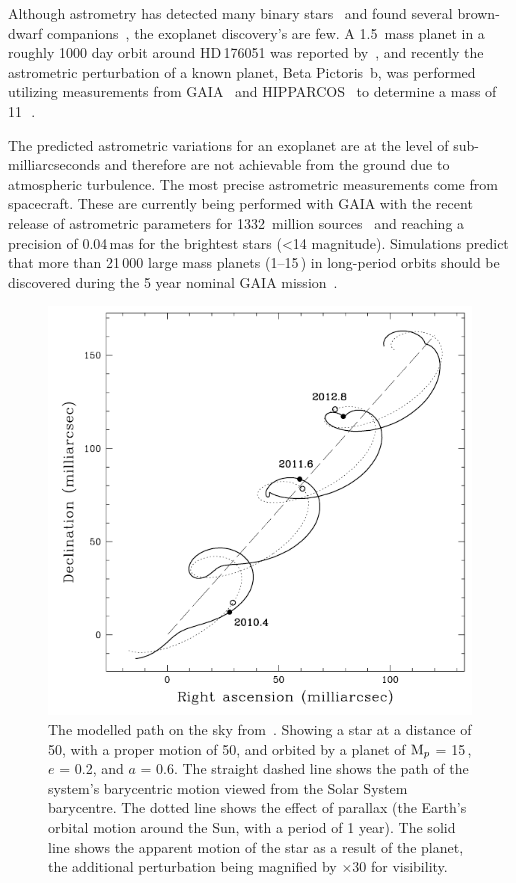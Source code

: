 Although astrometry has detected many binary stars~\citep[e.g.][]{gontcharov_new_2000} and found several brown-dwarf companions~\citep[e.g.][]{sahlmann_search_2011}, the exoplanet discovery's are few.
A 1.5\,\Mjup{} mass planet in a roughly 1000 day orbit around {HD\,176051} was reported by~\citet{muterspaugh_phases_2010}, and recently the astrometric perturbation of a known planet, {Beta Pictoris~b}, was performed utilizing measurements from {GAIA}~\citep{gaiacollaboration_gaia_2016} and {HIPPARCOS}~\citep{esa_hipparcos_1997} to determine a mass of 11\,\Mjup~\citep{snellen_mass_2018}.

The predicted astrometric variations for an exoplanet are at the level of sub-milliarcseconds and therefore are not achievable from the ground due to atmospheric turbulence.
The most precise astrometric measurements come from spacecraft.
These are currently being performed with GAIA with the recent release of astrometric parameters for 1332~million sources~\citep{collaboration_gaia_2018} and reaching a precision of 0.04\,mas for the brightest stars (<14 magnitude).
Simulations predict that more than 21\,000 large mass planets (1--15\,\Mjup) in long-period orbits should be discovered during the 5 year nominal GAIA mission~\citep{perryman_astrometric_2014}.

\begin{figure}
    \centering
    \includegraphics[width=0.5\linewidth]{./figures/introduction/Astrometry_Perryman2000.png}
    \caption{The modelled path on the sky from~\citet{perryman_extrasolar_2000}.
        Showing a star at a distance of 50\pc, with a proper motion of 50\masperyr{}, and orbited by a planet of $\textrm{M}_{p}$ = 15\,\Mjup{}, $e$ = 0.2, and $a$ = 0.6\AU{}.
        The straight dashed line shows the path of the system's barycentric motion viewed from the Solar System barycentre.
        The dotted line shows the effect of parallax (the Earth's orbital motion around the Sun, with a period of 1 year).
        The solid line shows the apparent motion of the star as a result of the planet, the additional perturbation being magnified by $\times 30$ for visibility.
    }
    \label{fig:astrometry_perryman}
\end{figure}


